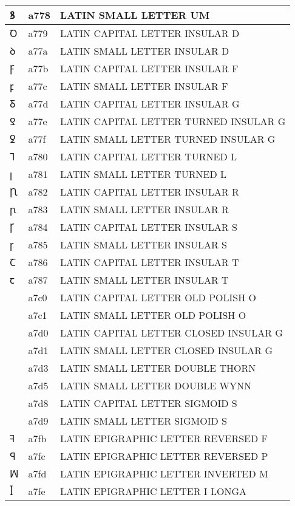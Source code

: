 \documentclass[12pt,letterpaper,openany]{book}
\begin{document}
\begin{center}
\begin{supertabular}{|m{0.25in}|m{0.5in}|m{4in}|}
			ꝸ & a778 & LATIN SMALL LETTER UM\\\hline
			Ꝺ & a779 & LATIN CAPITAL LETTER INSULAR D\\\hline
			ꝺ & a77a & LATIN SMALL LETTER INSULAR D\\\hline
			Ꝼ & a77b & LATIN CAPITAL LETTER INSULAR F\\\hline
			ꝼ & a77c & LATIN SMALL LETTER INSULAR F\\\hline
			Ᵹ & a77d & LATIN CAPITAL LETTER INSULAR G\\\hline
			Ꝿ & a77e & LATIN CAPITAL LETTER TURNED INSULAR G\\\hline
			ꝿ & a77f & LATIN SMALL LETTER TURNED INSULAR G\\\hline
			Ꞁ & a780 & LATIN CAPITAL LETTER TURNED L\\\hline
			ꞁ & a781 & LATIN SMALL LETTER TURNED L\\\hline
			Ꞃ & a782 & LATIN CAPITAL LETTER INSULAR R\\\hline
			ꞃ & a783 & LATIN SMALL LETTER INSULAR R\\\hline
			Ꞅ & a784 & LATIN CAPITAL LETTER INSULAR S\\\hline
			ꞅ & a785 & LATIN SMALL LETTER INSULAR S\\\hline
			Ꞇ & a786 & LATIN CAPITAL LETTER INSULAR T\\\hline
			ꞇ & a787 & LATIN SMALL LETTER INSULAR T\\\hline
			Ꟁ & a7c0 & LATIN CAPITAL LETTER OLD POLISH O\\\hline
			ꟁ & a7c1 & LATIN SMALL LETTER OLD POLISH O\\\hline
			Ꟑ & a7d0 & LATIN CAPITAL LETTER CLOSED INSULAR G\\\hline
			ꟑ & a7d1 & LATIN SMALL LETTER CLOSED INSULAR G\\\hline
			ꟓ & a7d3 & LATIN SMALL LETTER DOUBLE THORN\\\hline
			ꟕ & a7d5 & LATIN SMALL LETTER DOUBLE WYNN\\\hline
			Ꟙ & a7d8 & LATIN CAPITAL LETTER SIGMOID S\\\hline
			ꟙ & a7d9 & LATIN SMALL LETTER SIGMOID S\\\hline
			ꟻ & a7fb & LATIN EPIGRAPHIC LETTER REVERSED F\\\hline
			ꟼ & a7fc & LATIN EPIGRAPHIC LETTER REVERSED P\\\hline
			ꟽ & a7fd & LATIN EPIGRAPHIC LETTER INVERTED M\\\hline
			ꟾ & a7fe & LATIN EPIGRAPHIC LETTER I LONGA\\\hline

\end{supertabular}
\end{center}
\end{document}
